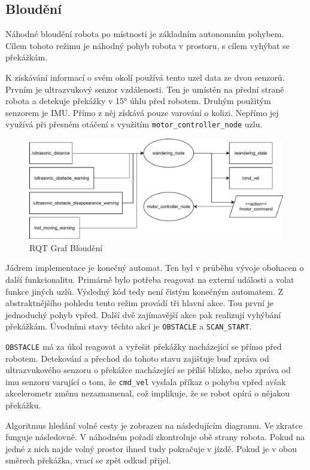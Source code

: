 \subsection*{Bloudění}
Náhodné bloudění robota po místnosti je základním autonomním pohybem. Cílem tohoto režimu je náhodný pohyb robota v prostoru, s cílem vyhýbat se překážkám.

K získávání informací o svém okolí používá tento uzel data ze dvou senzorů. Prvním je ultrazvukový senzor vzdálenosti. Ten je umístěn na přední straně robota a detekuje překážky v 15° úhlu před robotem. Druhým použitým senzorem je IMU. Přímo z něj získává pouze varování o kolizi. Nepřímo jej využívá při přesném otáčení s využitím  \verb|motor_controller_node| uzlu.

\begin{figure}[h!]
	\centering
	\includegraphics[scale=0.75]{obrazky-figures/wandering_rqt.pdf}
	\caption{RQT Graf Bloudění}
	\label{}
\end{figure}

Jádrem implementace je konečný automat. Ten byl v průběhu vývoje obohacen o další funkcionalitu. Primárně bylo potřeba reagovat na externí události a volat funkce jiných uzlů. Výsledný kód tedy není čistým konečným automatem. Z abstraktnějšího pohledu tento režim provádí tři hlavní akce. Tou první je jednoduchý pohyb vpřed. Další dvě zajímavější akce pak realizují vyhýbání překážkám. Úvodními stavy těchto akcí je \verb|OBSTACLE| a \verb|SCAN_START|.

\verb|OBSTACLE| má za úkol reagovat a vyřešit překážky nacházející se přímo před robotem. Detekování a přechod do tohoto stavu zajišťuje buď zpráva od ultrazvukového senzoru o překážce nacházející se příliš blízko, nebo zpráva od imu senzoru varující o tom, že \verb|cmd_vel| vyslala příkaz o pohybu vpřed avšak akcelerometr změnu nezaznamenal, což implikuje, že se robot opírá o nějakou překážku.

Algoritmus hledání volné cesty je zobrazen na následujícím diagramu. Ve zkratce funguje následovně. V náhodném pořadí zkontroluje obě strany robota. Pokud na jedné z nich najde volný prostor ihned tudy pokračuje v jízdě. Pokud je v obou směrech překážka, vrací se zpět odkud přijel.

